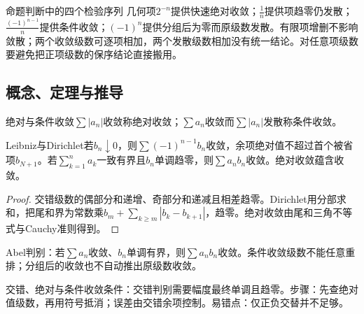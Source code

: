 \begin{method}{命题判断中的四个检验序列}
几何项$2^{-n}$提供快速绝对收敛；$\frac{1}{n}$提供项趋零仍发散；$\frac{(-1)^{n-1}}{n}$提供条件收敛；$(-1)^n$提供分组后为零而原级数发散。有限项增删不影响敛散；两个收敛级数可逐项相加，两个发散级数相加没有统一结论。对任意项级数要避免把正项级数的保序结论直接搬用。
\end{method}

\subsection{概念、定理与推导}

\begin{definition}{绝对与条件收敛}$\sum|a_n|$收敛称绝对收敛；$\sum a_n$收敛而$\sum|a_n|$发散称条件收敛。\end{definition}
\begin{theorem}{Leibniz与Dirichlet}若$b_n\downarrow0$，则$\sum(-1)^{n-1}b_n$收敛，余项绝对值不超过首个被省项$b_{N+1}$。若$\sum_{k=1}^na_k$一致有界且$b_n$单调趋零，则$\sum a_nb_n$收敛。绝对收敛蕴含收敛。\end{theorem}
\begin{proof}交错级数的偶部分和递增、奇部分和递减且相差趋零。Dirichlet用分部求和，把尾和界为常数乘$b_m+\sum_{k\ge m}|b_k-b_{k+1}|$，趋零。绝对收敛由尾和三角不等式与Cauchy准则得到。\end{proof}
Abel判别：若$\sum a_n$收敛、$b_n$单调有界，则$\sum a_nb_n$收敛。条件收敛级数不能任意重排；分组后的收敛也不自动推出原级数收敛。

\begin{method}{交错、绝对与条件收敛}条件：交错判别需要幅度最终单调且趋零。步骤：先查绝对值级数，再用符号抵消；误差由交错余项控制。易错点：仅正负交替并不足够。\end{method}

